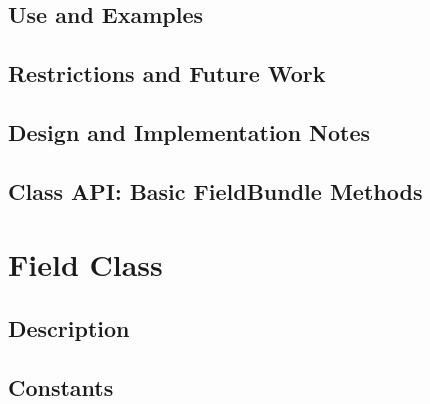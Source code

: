 \documentclass[english]{article}
\begin{document}
\subsection{Use and Examples}





\subsection{Restrictions and Future Work}

\subsection{Design and Implementation Notes}

%
%
\subsection{Class API: Basic FieldBundle Methods}

%
%
\section{Field Class}
\subsection{Description}

\subsection{Constants}

\end{document}
